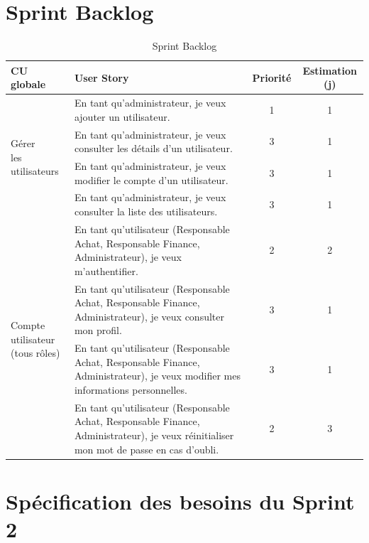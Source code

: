 \documentclass[a4paper,11pt]{report}
\begin{document}
\section{Sprint Backlog}
\begin{table}[htbp]
  \centering
  \caption{Sprint Backlog}
  \label{tab:sprint-backlog}
  \begin{tabular}{|p{3cm}|p{8cm}|c|c|}
    \hline
    \textbf{CU globale} & \textbf{User Story} & \textbf{Priorité} & \textbf{Estimation (j)} \\
    \hline

    \multirow{4}{=}{\parbox{3cm}{Gérer \\ les utilisateurs}} 
      & En tant qu’administrateur, je veux ajouter un utilisateur. 
      & 1 & 1 \\ \cline{2-4}
    & En tant qu’administrateur, je veux consulter les détails d’un utilisateur. 
      & 3 & 1 \\ \cline{2-4}
    & En tant qu’administrateur, je veux modifier le compte d’un utilisateur. 
      & 3 & 1 \\ \cline{2-4}
    & En tant qu’administrateur, je veux consulter la liste des utilisateurs. 
      & 3 & 1 \\
    \hline

    \multirow{4}{=}{\parbox{3cm}{Compte utilisateur \\ (tous rôles)}} 
      & En tant qu’utilisateur (Responsable Achat, Responsable Finance, Administrateur), je veux m’authentifier. 
      & 2 & 2 \\ \cline{2-4}
    & En tant qu’utilisateur (Responsable Achat, Responsable Finance, Administrateur), je veux consulter mon profil. 
      & 3 & 1 \\ \cline{2-4}
    & En tant qu’utilisateur (Responsable Achat, Responsable Finance, Administrateur), je veux modifier mes informations personnelles. 
      & 3 & 1 \\ \cline{2-4}
    & En tant qu’utilisateur (Responsable Achat, Responsable Finance, Administrateur), je veux réinitialiser mon mot de passe en cas d’oubli. 
      & 2 & 3 \\
    \hline
  \end{tabular}
\end{table}




\section{Spécification des besoins du Sprint 2}
\end{document}
